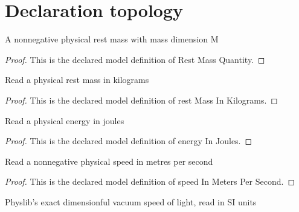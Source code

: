 \section{Declaration topology}
\begin{definition}
  \label{def:physics:phyx-mini-0560:phyxminiproblems-problemphyxmini0560-restmassquantity}
  A nonnegative physical rest mass with mass dimension M
\end{definition}
\begin{proof}
  This is the declared model definition of Rest Mass Quantity.
\end{proof}
\begin{definition}
  \label{def:physics:phyx-mini-0560:phyxminiproblems-problemphyxmini0560-restmassinkilograms}
  Read a physical rest mass in kilograms
\end{definition}
\begin{proof}
  This is the declared model definition of rest Mass In Kilograms.
\end{proof}
\begin{definition}
  \label{def:physics:phyx-mini-0560:phyxminiproblems-problemphyxmini0560-energyinjoules}
  Read a physical energy in joules
\end{definition}
\begin{proof}
  This is the declared model definition of energy In Joules.
\end{proof}
\begin{definition}
  \label{def:physics:phyx-mini-0560:phyxminiproblems-problemphyxmini0560-speedinmeterspersecond}
  Read a nonnegative physical speed in metres per second
\end{definition}
\begin{proof}
  This is the declared model definition of speed In Meters Per Second.
\end{proof}
\begin{definition}
  \label{def:physics:phyx-mini-0560:phyxminiproblems-problemphyxmini0560-vacuumlightspeedinmeterspersecond}
  Physlib's exact dimensionful vacuum speed of light, read in SI units
\end{definition}
